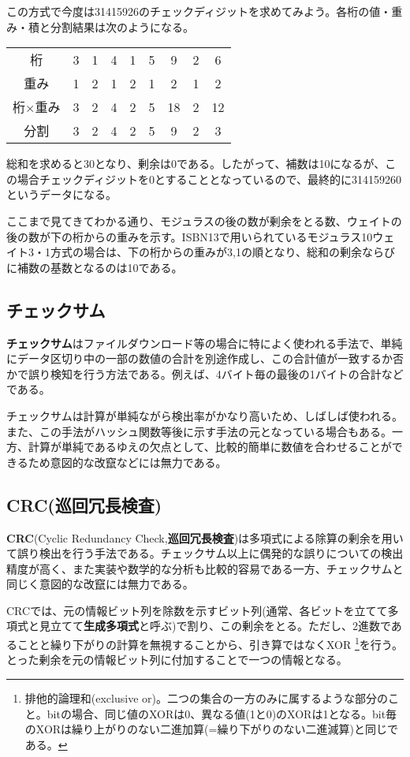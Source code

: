 この方式で今度は31415926のチェックディジットを求めてみよう。各桁の値・重み・積と分割結果は次のようになる。
\begin{center}
\begin{tabular}{c|cccccccc}
桁&3&1&4&1&5&9&2&6\\
重み&1&2&1&2&1&2&1&2\\ \hline
桁$\times$重み&3&2&4&2&5&18&2&12\\ \hline
分割&3&2&4&2&5&9&2&3\\
\end{tabular}
\end{center}
総和を求めると30となり、剰余は0である。したがって、補数は10になるが、この場合チェックディジットを0とすることとなっているので、最終的に314159260というデータになる。

ここまで見てきてわかる通り、モジュラスの後の数が剰余をとる数、ウェイトの後の数が下の桁からの重みを示す。ISBN13で用いられているモジュラス10ウェイト3・1方式の場合は、下の桁からの重みが3,1の順となり、総和の剰余ならびに補数の基数となるのは10である。

\subsection{チェックサム}
\textbf{チェックサム}はファイルダウンロード等の場合に特によく使われる手法で、単純にデータ区切り中の一部の数値の合計を別途作成し、この合計値が一致するか否かで誤り検知を行う方法である。例えば、4バイト毎の最後の1バイトの合計などである。

チェックサムは計算が単純ながら検出率がかなり高いため、しばしば使われる。また、この手法がハッシュ関数等後に示す手法の元となっている場合もある。一方、計算が単純であるゆえの欠点として、比較的簡単に数値を合わせることができるため意図的な改竄などには無力である。

\subsection{CRC(巡回冗長検査)}
\textbf{CRC}(Cyclic Redundancy Check,\textbf{巡回冗長検査})は多項式による除算の剰余を用いて誤り検出を行う手法である。チェックサム以上に偶発的な誤りについての検出精度が高く、また実装や数学的な分析も比較的容易である一方、チェックサムと同じく意図的な改竄には無力である。

CRCでは、元の情報ビット列を除数を示すビット列(通常、各ビットを立てて多項式と見立てて\textbf{生成多項式}と呼ぶ)で割り、この剰余をとる。ただし、2進数であることと繰り下がりの計算を無視することから、引き算ではなくXOR \footnote{排他的論理和(exclusive or)。二つの集合の一方のみに属するような部分のこと。bitの場合、同じ値のXORは0、異なる値(1と0)のXORは1となる。bit毎のXORは繰り上がりのない二進加算(=繰り下がりのない二進減算)と同じである。}を行う。とった剰余を元の情報ビット列に付加することで一つの情報となる。

